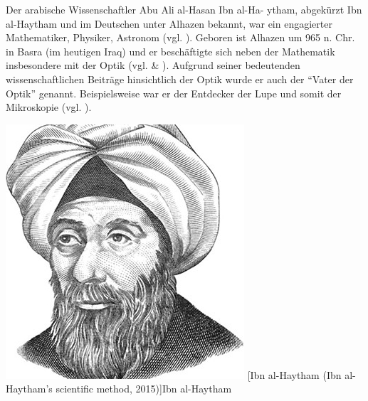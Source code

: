 \begin{minipage}{0.65\linewidth}
Der arabische Wissenschaftler Abu Ali al-Hasan Ibn al-Ha-
ytham, abgekürzt Ibn al-Haytham und im Deutschen unter
Alhazen bekannt, war ein engagierter Mathematiker,
Physiker, Astronom (vgl. \cite{rashed}). Geboren ist
Alhazen um 965 n. Chr. in Basra (im heutigen Iraq) und
er beschäftigte sich neben der Mathematik insbesondere 
mit der Optik (vgl. \cite{alhazen} \& \cite{oconnor_alhazen}).
Aufgrund seiner bedeutenden wissenschaftlichen Beiträge
hinsichtlich der Optik wurde er auch der ``Vater der Optik''
genannt. Beispielsweise war er der Entdecker der Lupe 
und somit der Mikroskopie (vgl. \cite{alhazen}).
\end{minipage}
\hfil
\begin{minipage}[r]{0.3\linewidth}
  \captionsetup{type=figure,font=small,skip=6pt,format=plain}%
  \capstart
  \includegraphics[width=1.0\linewidth]{./images/alhazen.jpg}
  [Ibn al-Haytham (Ibn al-Haytham's scientific method, 2015)]{Ibn al-Haytham}
  \label{fig:portrait_alhazen}
\end{minipage}
\vspace{.3cm}

